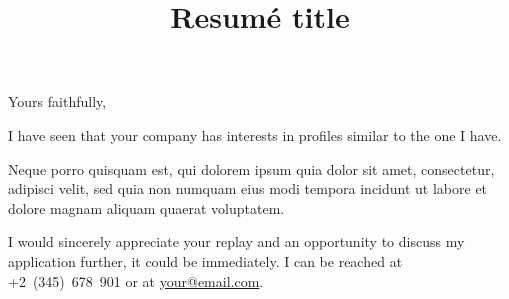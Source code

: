 \documentclass[11pt,a4paper,sans]{moderncv}        %
\title{Resumé title}                               %
\begin{document}

\closing{Yours faithfully,}

\makelettertitle
   
\justifying
I have seen that your company has interests in profiles similar to the one I have. 

\companyName \companyProfile{\companyProfileId} \companyExtraInfo

\myPresentation{\myProfileId} 

\myStudies{\myProfileId} 

Neque porro quisquam est, qui dolorem ipsum quia dolor sit amet, consectetur, adipisci velit, sed quia non numquam eius modi tempora incidunt ut labore et dolore magnam aliquam quaerat voluptatem. 

I would sincerely appreciate your replay and an opportunity to discuss my application further, it could be immediately. I can be reached at +2~(345)~678~901 or at \href{mailto:your@email.com}{your@email.com}.
 
\makeletterclosing
\end{document}
